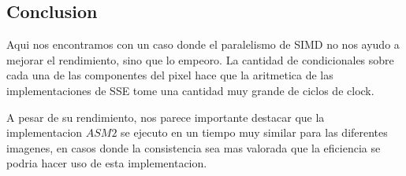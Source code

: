 



\subsection{Conclusion}
Aqui nos encontramos con un caso donde el paralelismo de SIMD no nos ayudo a mejorar el rendimiento, sino que lo empeoro. La cantidad de condicionales sobre cada una de las componentes del pixel hace que la aritmetica de las implementaciones de SSE tome una cantidad muy grande de ciclos de clock.

A pesar de su rendimiento, nos parece importante destacar que la implementacion $ASM2$ se ejecuto en un tiempo muy similar para las diferentes imagenes, en casos donde la consistencia sea mas valorada que la eficiencia se podria hacer uso de esta implementacion.



